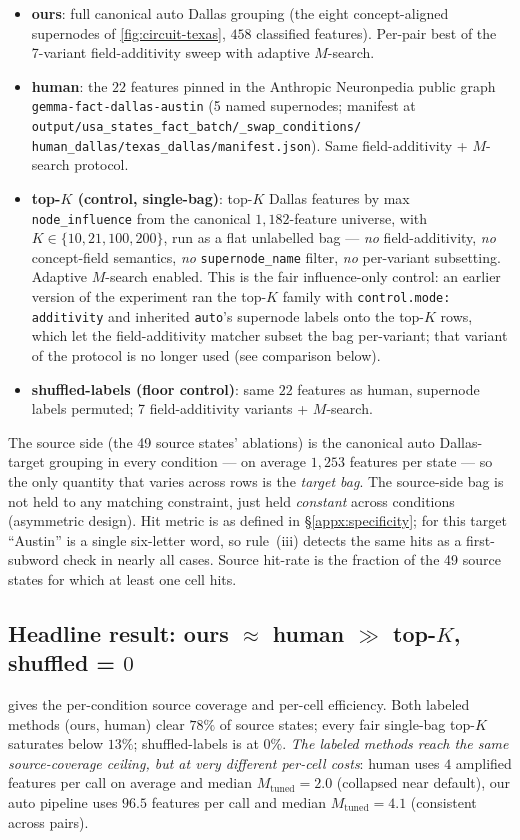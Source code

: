 \begin{itemize}\itemsep0pt
\item \textbf{ours}: full canonical auto Dallas grouping (the eight concept-aligned supernodes of \cref{fig:circuit-texas}, $458$ classified features). Per-pair best of the 7-variant field-additivity sweep with adaptive $M$-search.
\item \textbf{human}: the $22$ features pinned in the Anthropic Neuronpedia public graph \texttt{gemma-fact-dallas-austin} (5 named supernodes; manifest at \\ \texttt{output/usa\_states\_fact\_batch/\_swap\_conditions/} \\ \texttt{human\_dallas/texas\_dallas/manifest.json}). Same field-additivity + $M$-search protocol.
\item \textbf{top-$K$ (control, single-bag)}: top-$K$ Dallas features by max \texttt{node\_influence} from the canonical $1{,}182$-feature universe, with $K \in \{10, 21, 100, 200\}$, run as a flat unlabelled bag --- \emph{no} field-additivity, \emph{no} concept-field semantics, \emph{no} \texttt{supernode\_name} filter, \emph{no} per-variant subsetting. Adaptive $M$-search enabled. This is the fair influence-only control: an earlier version of the experiment ran the top-$K$ family with \texttt{control.mode: additivity} and inherited \texttt{auto}'s supernode labels onto the top-$K$ rows, which let the field-additivity matcher subset the bag per-variant; that variant of the protocol is no longer used (see comparison below).
\item \textbf{shuffled-labels (floor control)}: same $22$ features as human, supernode labels permuted; 7 field-additivity variants + $M$-search.
\end{itemize}

The source side (the 49 source states' ablations) is the canonical auto Dallas-target grouping in every condition --- on average $1{,}253$ features per state --- so the only quantity that varies across rows is the \emph{target bag}. The source-side bag is not held to any matching constraint, just held \emph{constant} across conditions (asymmetric design). Hit metric is as defined in \S\ref{appx:specificity}; for this target ``Austin'' is a single six-letter word, so rule~(iii) detects the same hits as a first-subword check in nearly all cases. Source hit-rate is the fraction of the 49 source states for which at least one cell hits.

\subsection{Headline result: ours $\approx$ human $\gg$ top-$K$, shuffled = $0$}
 gives the per-condition source coverage and per-cell efficiency. Both labeled methods (ours, human) clear $78\%$ of source states; every fair single-bag top-$K$ saturates below $13\%$; shuffled-labels is at $0\%$. \emph{The labeled methods reach the same source-coverage ceiling, but at very different per-cell costs}: human uses $4$ amplified features per call on average and median $M_{\mathrm{tuned}}{=}2.0$ (collapsed near default), our auto pipeline uses $96.5$ features per call and median $M_{\mathrm{tuned}}{=}4.1$ (consistent across pairs).

